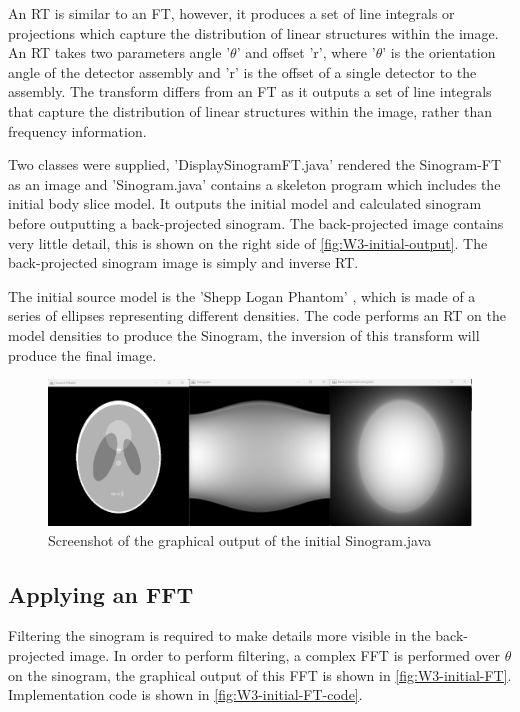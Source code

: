 An RT is similar to an FT, however, it produces a set of line integrals or projections which capture the distribution of linear structures within the image. An RT takes two parameters angle '$\theta$' and offset 'r', where '$\theta$' is the orientation angle of the detector assembly and 'r' is the offset of a single detector to the assembly. The transform differs from an FT as it outputs a set of line integrals that capture the distribution of linear structures within the image, rather than frequency information.

Two classes were supplied, 'DisplaySinogramFT.java' rendered the Sinogram-FT as an image and 'Sinogram.java' contains a skeleton program which includes the initial body slice model. It outputs the initial model and calculated sinogram before outputting a back-projected sinogram. The back-projected image contains very little detail, this is shown on the right side of \autoref{fig:W3-initial-output}. The back-projected sinogram image is simply and inverse RT.

The initial source model is the 'Shepp Logan Phantom' \textcite{6499235}, which is made of a series of ellipses representing different densities. The code performs an RT on the model densities to produce the Sinogram, the inversion of this transform will produce the final image. 


\begin{figure}[H] 
    \centering
    \includegraphics[width=0.9\columnwidth]{Figures/Week 3/initial-graphics.png}
    \caption{Screenshot of the graphical output of the initial Sinogram.java}
    \label{fig:W3-initial-output}
\end{figure}


\subsection{Applying an FFT}
Filtering the sinogram is required to make details more visible in the back-projected image. In order to perform filtering, a complex FFT is performed over \(\theta\) on the sinogram, the graphical output of this FFT is shown in \autoref{fig:W3-initial-FT}. Implementation code is shown in \autoref{fig:W3-initial-FT-code}.

